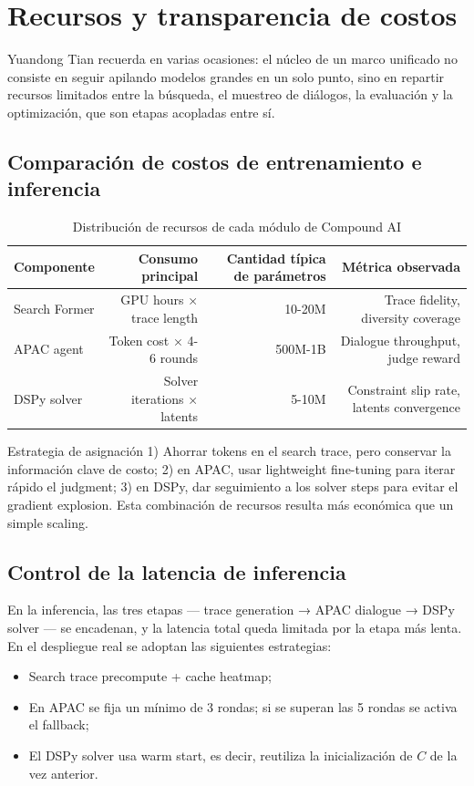 \section{Recursos y transparencia de costos}

Yuandong Tian recuerda en varias ocasiones: el núcleo de un marco unificado no consiste en seguir apilando modelos grandes en un solo punto, sino en repartir recursos limitados entre la búsqueda, el muestreo de diálogos, la evaluación y la optimización, que son etapas acopladas entre sí.

\subsection{Comparación de costos de entrenamiento e inferencia}

\begin{table}[H]
\centering
\begin{tabular}{lrrr}
\toprule
Componente & Consumo principal & Cantidad típica de parámetros & Métrica observada \\
\midrule
Search Former & GPU hours × trace length & 10-20M & Trace fidelity, diversity coverage \\
APAC agent & Token cost × 4-6 rounds & 500M-1B & Dialogue throughput, judge reward \\
DSPy solver & Solver iterations × latents & 5-10M & Constraint slip rate, latents convergence \\
\bottomrule
\end{tabular}
\caption{Distribución de recursos de cada módulo de Compound AI}
\end{table}

\begin{importantbox}{Estrategia de asignación}
1) Ahorrar tokens en el search trace, pero conservar la información clave de costo; 2) en APAC, usar lightweight fine-tuning para iterar rápido el judgment; 3) en DSPy, dar seguimiento a los solver steps para evitar el gradient explosion. Esta combinación de recursos resulta más económica que un simple scaling.
\end{importantbox}

\subsection{Control de la latencia de inferencia}

En la inferencia, las tres etapas — trace generation → APAC dialogue → DSPy solver — se encadenan, y la latencia total queda limitada por la etapa más lenta. En el despliegue real se adoptan las siguientes estrategias:
\begin{itemize}
    \item Search trace precompute + cache heatmap;
    \item En APAC se fija un mínimo de 3 rondas; si se superan las 5 rondas se activa el fallback;
    \item El DSPy solver usa warm start, es decir, reutiliza la inicialización de \(C\) de la vez anterior.
\end{itemize}

